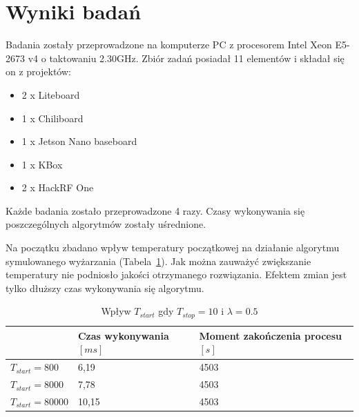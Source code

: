 \section{Wyniki badań}
Badania zostały przeprowadzone na komputerze PC z procesorem Intel Xeon E5-2673 v4 o taktowaniu 2.30GHz. Zbiór zadań posiadał 11 elementów i składał się on z projektów:
\begin{itemize}
	\item 2 x Liteboard
	\item 1 x Chiliboard
	\item 1 x Jetson Nano baseboard
	\item 1 x KBox
	\item 2 x HackRF One
\end{itemize}

Każde badania zostało przeprowadzone 4 razy. Czasy wykonywania się poszczególnych algorytmów zostały uśrednione.

Na początku zbadano wpływ temperatury początkowej na działanie algorytmu symulowanego wyżarzania (Tabela~\ref{tstart_sa}). Jak można zauważyć zwiększanie temperatury nie podniosło jakości otrzymanego rozwiązania. Efektem zmian jest tylko dłuższy czas wykonywania się algorytmu.

\begin{table}[H]
	\centering
	\label{tstart_sa}
	\caption{Wpływ $T_{start}$ gdy $T_{stop}=10$ i $\lambda=0.5$}
	\begin{tabular}{lll}
		\toprule
		                  & Czas wykonywania$[ms]$ & Moment zakończenia procesu$[s]$ \\
		\midrule
		$T_{start}=800$   & 6,19                   & 4503                             \\
		$T_{start}=8000$  & 7,78                   & 4503                             \\
		$T_{start}=80000$ & 10,15                  & 4503                             \\
		\bottomrule
	\end{tabular}
\end{table}

